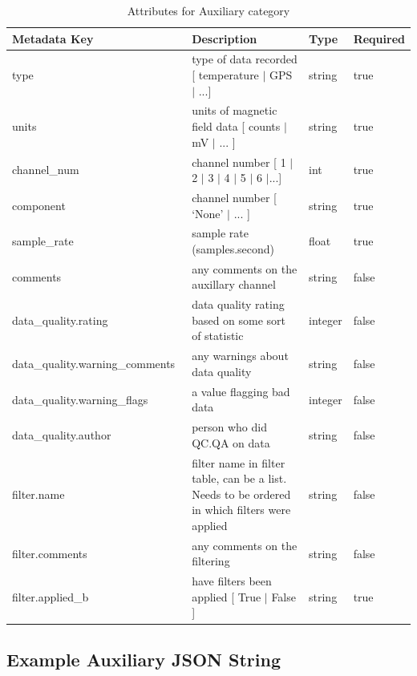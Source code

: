\documentclass{article}
\begin{document}
\begin{table}[htb!]
    \caption[Attributes for Auxiliary Channel]{Attributes for Auxiliary category}
    \begin{tabular}{|l|p{3in}|l|l|}
        \hline
        \textbf{Metadata Key} & \textbf{Description} & \textbf{Type} & \textbf{Required} \\ \hline
        type\ & type of data recorded [ temperature $|$ GPS $|$ ...] & string & true \\ \hline
        units\ & units of magnetic field data [ counts $|$ mV $|$ ... ] & string &  true \\ \hline
        channel\_num\ & channel number [ 1 $|$ 2 $|$ 3 $|$ 4 $|$ 5 $|$ 6 $|$...] & int &  true \\ \hline
        component\ & channel number [ `None' $|$ ... ] & string &  true \\ \hline
        sample\_rate\ & sample rate (samples.second) & float &  true \\ \hline
        comments\ & any comments on the auxillary channel & string &  false \\ \hline
        data\_quality.rating\ & data quality rating based on some sort of statistic & integer &  false \\ \hline
        data\_quality.warning\_comments\ & any warnings about data quality & string &   false \\ \hline
        data\_quality.warning\_flags\ & a value flagging bad data  & integer &  false \\ \hline
        data\_quality.author\ & person who did QC.QA on data & string &   false \\ \hline
        filter.name\ & filter name in filter table, can be a list. Needs to be ordered in which filters were applied & string &  false \\ \hline
        filter.comments\ & any comments on the filtering & string &  false \\ \hline
        filter.applied\_b & have filters been applied [ True $|$ False ] & string & true \\ \hline
    \end{tabular}
    \label{tab:aux}
\end{table}

\subsection{Example Auxiliary JSON String} 
\end{document}
